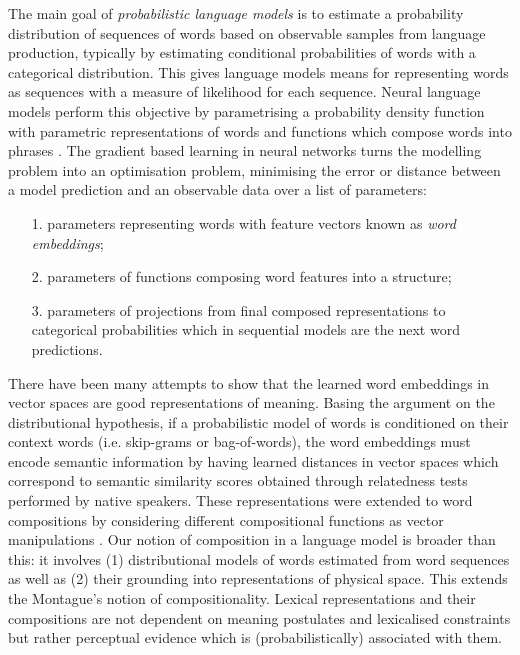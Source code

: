 The main goal of \emph{probabilistic language models} is to estimate a
probability distribution of sequences of words based on observable samples
from language production, typically by estimating conditional
probabilities of words with a categorical distribution. This gives language
models means for representing words as sequences with a measure of likelihood
for each sequence. Neural language models perform this objective by
parametrising a probability density function with parametric representations
of words and functions which compose words into phrases
\cite{bengio2003neural,mnih2007three,mikolov2010recurrent}. The gradient based
learning in neural networks turns the modelling problem into an optimisation problem,
minimising the error or distance between a model prediction and an observable
data over a list of parameters:
\begin{enumerate}[topsep=0em,itemsep=0em,partopsep=0em,parsep=0em]
\item[1.] parameters representing words with feature vectors known as
\textit{word embeddings};
\item[2.] parameters of functions composing word features into a
structure; %
\item[3.] parameters of projections from final composed representations to
categorical probabilities which in sequential models are the next word predictions.
\end{enumerate}

There have been many attempts to show that the learned word embeddings in vector
spaces are good representations of meaning. Basing the argument on
the distributional hypothesis, if a probabilistic model of words is conditioned on
their context words (i.e. skip-grams or bag-of-words), the word embeddings must
encode semantic information by having learned distances in vector spaces which
correspond to semantic similarity scores obtained through relatedness tests performed by native speakers. These representations
were extended to word compositions by considering different compositional functions as vector manipulations
\cite{mitchell2010composition,coecke2010mathematical,baroni2014frege}.
Our notion of composition in a language model is broader
than this: it involves (1) distributional models of words estimated from word
sequences as well as (2) their grounding into representations of physical space.
This extends the Montague's notion of compositionality. Lexical
representations and their compositions are not dependent on meaning postulates and lexicalised constraints
but rather perceptual evidence which is (probabilistically) associated with them.

